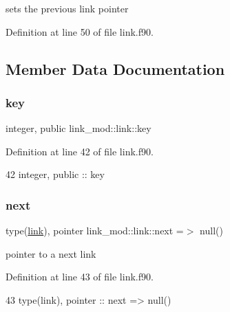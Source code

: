 sets the previous link pointer 



Definition at line 50 of file link.\+f90.



\subsection{Member Data Documentation}
\mbox{\label{structlink__mod_1_1link_a3f4862b7d40b8f01c7c65f85d1a567ef}} 
\subsubsection{\texorpdfstring{key}{key}}
{\footnotesize\ttfamily integer, public link\+\_\+mod\+::link\+::key}



Definition at line 42 of file link.\+f90.


\begin{DoxyCode}
42         \textcolor{keywordtype}{integer}, \textcolor{keywordtype}{public} :: key
\end{DoxyCode}
\mbox{\label{structlink__mod_1_1link_ab98cf41b8ed6245972f95aae4667b249}} 
\subsubsection{\texorpdfstring{next}{next}}
{\footnotesize\ttfamily type(\mbox{\hyperlink{structlink__mod_1_1link}{link}}), pointer link\+\_\+mod\+::link\+::next =$>$ null()\hspace{0.3cm}{\ttfamily [private]}}



pointer to a next link 



Definition at line 43 of file link.\+f90.


\begin{DoxyCode}
43         \textcolor{keywordtype}{type}(link), \textcolor{keywordtype}{pointer} :: next => null() 
\end{DoxyCode}
\mbox{\label{structlink__mod_1_1link_ae85bee976bd1eff62006c9a89732da13}} 
